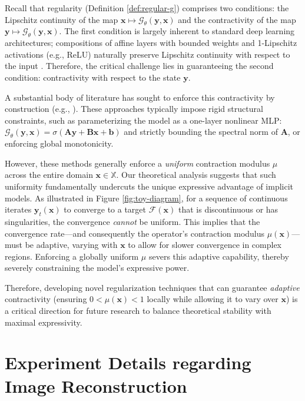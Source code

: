 \documentclass{amsart} %
\def\vb{{\bm{b}}}
\def\vx{{\bm{x}}}
\def\vy{{\bm{y}}}
\def\mA{{\bm{A}}}
\def\mB{{\bm{B}}}
\def\sX{{\mathbb{X}}}
\def\cF{{\mathcal{F}}}
\def\cG{{\mathcal{G}}}
\theoremstyle{definition}
\theoremstyle{remark}
\begin{document}
Recall that regularity (Definition \ref{def:regular-g}) comprises two conditions: the Lipschitz continuity of the map $\vx \mapsto \cG_\theta(\vy,\vx)$ and the contractivity of the map $\vy \mapsto \cG_\theta(\vy,\vx)$. The first condition is largely inherent to standard deep learning architectures; compositions of affine layers with bounded weights and 1-Lipschitz activations (e.g., ReLU) naturally preserve Lipschitz continuity with respect to the input \cite{miyato2018spectral,virmaux2018lipschitz}. Therefore, the critical challenge lies in guaranteeing the second condition: contractivity with respect to the state $\vy$. 

A substantial body of literature has sought to enforce this contractivity by construction (e.g., \cite{el2021implicit,winston2020monotone,jafarpour2021robust,revay2020lipschitz,havens2023exploiting}). These approaches typically impose rigid structural constraints, such as parameterizing the model as a one-layer nonlinear MLP: $\cG_\theta(\vy,\vx)=\sigma(\mA\vy+\mB\vx+\vb)$ and strictly bounding the spectral norm of $\mA$, or enforcing global monotonicity. 

However, these methods generally enforce a \textit{uniform} contraction modulus $\mu$ across the entire domain $\vx \in \sX$. Our theoretical analysis suggests that such uniformity fundamentally undercuts the unique expressive advantage of implicit models. As illustrated in Figure \ref{fig:toy-diagram}, for a sequence of continuous iterates $\vy_t(\vx)$ to converge to a target $\cF(\vx)$ that is discontinuous or has singularities, the convergence \textit{cannot} be uniform. This implies that the convergence rate—and consequently the operator's contraction modulus $\mu(\vx)$—must be adaptive, varying with $\vx$ to allow for slower convergence in complex regions. Enforcing a globally uniform $\mu$ severs this adaptive capability, thereby severely constraining the model's expressive power. 

Therefore, developing novel regularization techniques that can guarantee \textit{adaptive} contractivity (ensuring $0 < \mu(\vx) < 1$ locally while allowing it to vary over $\vx$) is a critical direction for future research to balance theoretical stability with maximal expressivity.






\section{Experiment Details regarding Image Reconstruction}
\label{sec:app-exp-inv}
\end{document}
